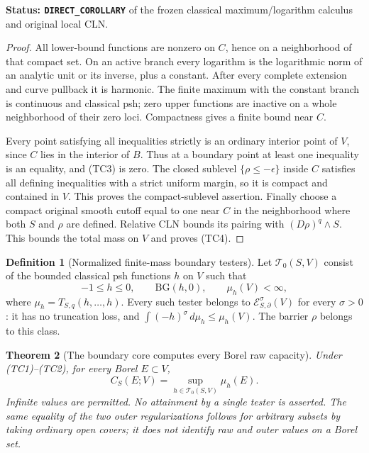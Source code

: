 \documentclass[11pt,a4paper]{article}
\numberwithin{equation}{section}
\newtheorem{theorem}{Theorem}[section]
\theoremstyle{definition}
\newtheorem{definition}[theorem]{Definition}
\theoremstyle{remark}
\begin{document}
\noindent\textbf{Status: \texttt{DIRECT\_COROLLARY}} of the
frozen classical maximum/logarithm calculus and original local CLN.

\begin{proof}
All lower-bound functions are nonzero on $C$, hence on a
neighborhood of that compact set. On an active branch every
logarithm is the logarithmic norm of an analytic unit or its
inverse, plus a constant. After every complete extension and
curve pullback it is harmonic. The finite maximum with the
constant branch is continuous and classical psh; zero upper
functions are inactive on a whole neighborhood of their zero
loci. Compactness gives a finite bound near $C$.

Every point satisfying all inequalities strictly is an ordinary
interior point of $V$, since $C$ lies in the interior of $B$.
Thus at a boundary point at least one inequality is an equality,
and (TC3) is zero. The closed sublevel $\{\rho\leq-\epsilon\}$
inside $C$ satisfies all defining inequalities with a strict
uniform margin, so it is compact and contained in $V$.
This proves the compact-sublevel assertion.
Finally choose a compact original smooth cutoff equal to one
near $C$ in the neighborhood where both $S$ and $\rho$ are
defined. Relative CLN bounds its pairing with $(D\rho)^q\wedge S$.
This bounds the total mass on $V$ and proves (TC4).
\end{proof}

\begin{definition}[Normalized finite-mass boundary testers]
\label{def:r11-finite-mass-tester-core}
Let $\mathscr T_0(S,V)$ consist of the bounded classical psh
functions $h$ on $V$ such that
\[
 -1\leq h\leq0,\qquad \mathrm{BG}(h,0),\qquad
                         \mu_h(V)<\infty,
 \tag{TC5}
\]
where $\mu_h=T_{S,q}(h,\ldots,h)$.
Every such tester belongs to
$\mathcal E^\sigma_{S,\partial}(V)$ for every $\sigma>0$:
it has no truncation loss, and
$\int(-h)^\sigma\,d\mu_h\leq\mu_h(V)$.
The barrier $\rho$ belongs to this class.
\end{definition}

\begin{theorem}[The boundary core computes every Borel raw capacity]
\label{thm:r11-finite-mass-capacity-core}
Under (TC1)--(TC2), for every Borel $E\subset V$,
\[
 \boxed{\quad
 C_S(E;V)=\sup_{h\in\mathscr T_0(S,V)}\mu_h(E).
 \quad}
 \tag{TC6}
\]
Infinite values are permitted. No attainment by a single tester
is asserted. The same equality of the two outer regularizations
follows for arbitrary subsets by taking ordinary open covers;
it does not identify raw and outer values on a Borel set.
\end{theorem}
\end{document}
